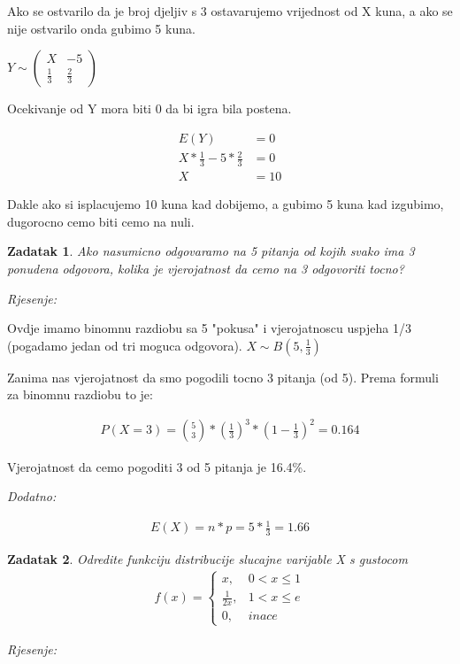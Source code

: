 \documentclass{report}
\newcommand{\rjesenje}{\begin{flushleft}\it Rjesenje:\end{flushleft}}
\newcommand{\onespace}{\vspace{1pc}}
\theoremstyle{plain}
\newtheorem{thm}{Zadatak}[chapter] %
\begin{document}
\onespace

Ako se ostvarilo da je broj djeljiv s 3 ostavarujemo vrijednost od X kuna, a ako
se nije ostvarilo onda gubimo 5 kuna.

\onespace

$Y \sim \begin{pmatrix} X& -5 \\ \frac{1}{3}& \frac{2}{3} \end{pmatrix} $

\onespace

Ocekivanje od Y mora biti 0 da bi igra bila postena.

\begin{align*}
    E(Y) &= 0\\
    X * \frac{1}{3} -5 * \frac{2}{3} &= 0 \\
    X &= 10
\end{align*}

Dakle ako si isplacujemo 10 kuna kad dobijemo, a gubimo 5 kuna kad izgubimo, 
dugorocno cemo biti cemo na nuli.

\onespace
\begin{thm}Ako nasumicno odgovaramo na 5 pitanja od kojih svako ima 3 ponudena odgovora,
    kolika je vjerojatnost da cemo na 3 odgovoriti tocno?\end{thm} 
\rjesenje
    
Ovdje imamo binomnu razdiobu sa 5 "pokusa" i vjerojatnoscu uspjeha 1/3 
(pogadamo jedan od tri moguca odgovora). $X \sim B(5, \frac{1}{3}) $

\onespace

Zanima nas vjerojatnost da smo pogodili tocno 3 pitanja (od 5). 
Prema formuli za binomnu razdiobu to je:

\begin{align*}
    P(X=3)=\binom{5}{3}*\left(\frac{1}{3}\right)^3*\left(1-\frac{1}{3}\right)^2 = 0.164
\end{align*}

Vjerojatnost da cemo pogoditi 3 od 5 pitanja je 16.4\%.

\begin{flushleft}\it Dodatno:\end{flushleft}

\begin{align*}
    E(X)=n*p=5*\frac{1}{3}=1.66
\end{align*}

\onespace
\begin{thm}Odredite funkciju distribucije slucajne varijable X s gustocom
    \begin{align*}
        f(x) = \left\{\begin{matrix} x, &0 < x\leq 1 \\ 
        \frac{1}{2x}, & 1 < x \leq e \\ 
        0, & inace \end{matrix}\right.
    \end{align*}
\end{thm} 
\rjesenje
\end{document}
